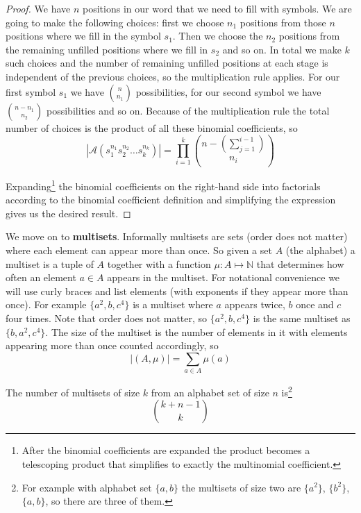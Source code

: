 \begin{proof}
We have $n$ positions in our word that we need to fill with symbols. We are going to make the following choices: first we choose $n_1$ positions from those $n$ positions where we fill in the symbol $s_1$. Then we choose the $n_2$ positions from the remaining unfilled positions where we fill in $s_2$ and so on. In total we make $k$ such choices and the number of remaining unfilled positions at each stage is independent of the previous choices, so the multiplication rule applies. For our first symbol $s_1$ we have $\binom{n}{n_1}$ possibilities, for our second symbol we have $\binom{n - n_1}{n_2}$ possibilities and so on. Because of the multiplication rule the total number of choices is the product of all these binomial coefficients, so
$$
|\mathcal{A}(s_1^{n_1}s_2^{n_2} \ldots s_k^{n_k})| = \prod_{i = 1}^k \binom{n - (\sum_{j = 1}^{i - 1})}{n_i}
$$

Expanding\footnote{After the binomial coefficients are expanded the product becomes a telescoping product that simplifies to exactly the multinomial coefficient.} the binomial coefficients on the right-hand side into factorials according to the binomial coefficient definition and simplifying the expression gives us the desired result.
\end{proof}

We move on to \textbf{multisets}. Informally multisets are sets (order does not matter) where each element can appear more than once. So given a set $A$ (the alphabet) a multiset is a tuple of $A$ together with a function $\mu: A \mapsto \mathbb{N}$ that determines how often an element $a \in A$ appears in the multiset. For notational convenience we will use curly braces and list elements (with exponents if they appear more than once). For example $\{a^2, b, c^4\}$ is a multiset where $a$ appears twice, $b$ once and $c$ four times. Note that order does not matter, so $\{a^2, b, c^4\}$ is the same multiset as $\{b, a^2, c^4\}$. The size of the multiset is the number of elements in it with elements appearing more than once counted accordingly, so 
$$
|(A, \mu)| = \sum_{a \in A} \mu(a)
$$

\begin{thm}\label{num_multisets}
The number of multisets of size $k$ from an alphabet set of size $n$ is\footnote{For example with alphabet set $\{a, b\}$ the multisets of size two are $\{a^2\}$, $\{b^2\}$, $\{a, b\}$, so there are three of them.}
$$
\binom{k + n - 1}{k}
$$
\end{thm}

